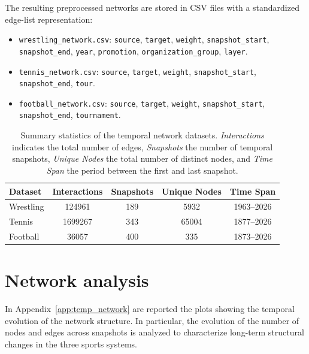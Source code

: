 The resulting preprocessed networks are stored in CSV files with a standardized edge-list representation:

\begin{itemize}
    \item \colorbox{gray!15}{\texttt{wrestling\_network.csv}}: \texttt{source}, \texttt{target}, \texttt{weight}, \texttt{snapshot\_start}, \texttt{snapshot\_end}, \texttt{year}, \texttt{promotion}, \texttt{organization\_group}, \texttt{layer}.

    \item \colorbox{gray!15}{\texttt{tennis\_network.csv}}: \texttt{source}, \texttt{target}, \texttt{weight}, \texttt{snapshot\_start}, \texttt{snapshot\_end}, \texttt{tour}.
    
    \item \colorbox{gray!15}{\texttt{football\_network.csv}}: \texttt{source}, \texttt{target}, \texttt{weight}, \texttt{snapshot\_start}, \texttt{snapshot\_end}, \texttt{tournament}.
\end{itemize}

\begin{table}[h]
\centering
\begin{tabular}{lcccc}
\hline
\textbf{Dataset} & \textbf{Interactions} & \textbf{Snapshots} & \textbf{Unique Nodes} & \textbf{Time Span} \\
\hline
Wrestling & 124961 & 189 & 5932 & 1963--2026 \\
Tennis & 1699267 & 343 & 65004 & 1877--2026 \\
Football & 36057 & 400 & 335 & 1873--2026 \\
\hline
\end{tabular}
\caption{Summary statistics of the temporal network datasets. \textit{Interactions} indicates the total number of edges, \textit{Snapshots} the number of temporal snapshots, \textit{Unique Nodes} the total number of distinct nodes, and \textit{Time Span} the period between the first and last snapshot.}
\label{tab:dataset_summary}
\end{table}


\section{Network analysis}

In Appendix~\ref{app:temp_network} are reported the plots showing the temporal evolution of the network structure. In particular, the evolution of the number of nodes and edges across snapshots is analyzed to characterize long-term structural changes in the three sports systems. 

